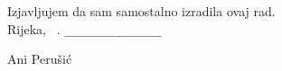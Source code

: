 

{ \large 
\vspace{15pt}
Izjavljujem da sam samostalno izradila ovaj rad. \vspace{7cm} \\ 

\noindent Rijeka, \MONTH~\thisyear.   
\hspace{5.5cm}
	\verb|_______________|  %

\begin{flushright}
	\vspace{-15pt}
	Ani Perušić
	\verb|      |   %
\end{flushright}

} %